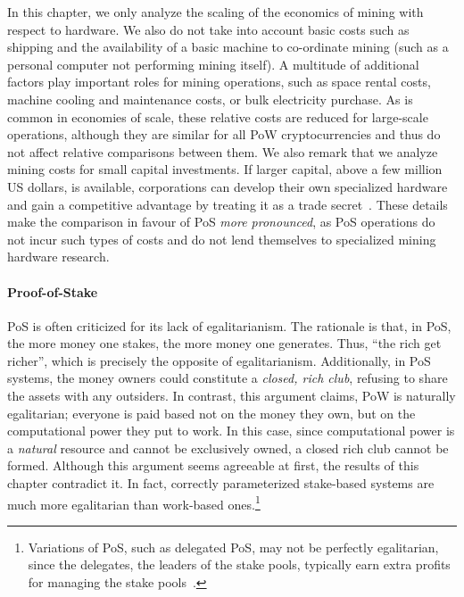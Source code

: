 In this chapter, we only analyze the scaling of the economics of mining with
respect to hardware. We also do not take into account basic costs such as
shipping and the availability of a basic machine to co-ordinate mining (such as
a personal computer not performing mining itself). A multitude of additional
factors play important roles for mining operations, such as space rental costs,
machine cooling and maintenance costs, or bulk electricity purchase. As is
common in economies of scale, these relative costs are reduced for large-scale
operations, although they are similar for all PoW cryptocurrencies and thus do
not affect relative comparisons between them. We also remark that we analyze
mining costs for small capital investments. If larger capital, \eg above a few
million US dollars, is available, corporations can develop their own
specialized hardware and gain a competitive advantage by treating it as a trade
secret~\cite{taylor2013bitcoin}. These details make the comparison in favour of
PoS \emph{more pronounced}, as PoS operations do not incur such types of costs
and do not lend themselves to specialized mining hardware research.

\paragraph{Proof-of-Stake}
PoS is often criticized for its lack of egalitarianism. The rationale is that,
in PoS, the more money one stakes, the more money one generates. Thus, ``the
rich get richer'', which is precisely the opposite of egalitarianism.
Additionally, in PoS systems, the money owners could constitute a \emph{closed,
rich club}, refusing to share the assets with any outsiders. In contrast, this
argument claims, PoW is naturally egalitarian; everyone is paid based not on
the money they own, but on the computational power they put to work. In this
case, since computational power is a \emph{natural} resource and cannot be
exclusively owned, a closed rich club cannot be formed. Although this argument
seems agreeable at first, the results of this chapter contradict it. In fact,
correctly parameterized stake-based systems are much more egalitarian than
work-based ones.\footnote{Variations of PoS, such as
delegated PoS, may not be perfectly egalitarian, since the delegates, \ie the
leaders of the stake pools, typically earn extra profits for managing the stake
pools~\cite{DBLP:conf/eurosp/BrunjesKKS20}.}

